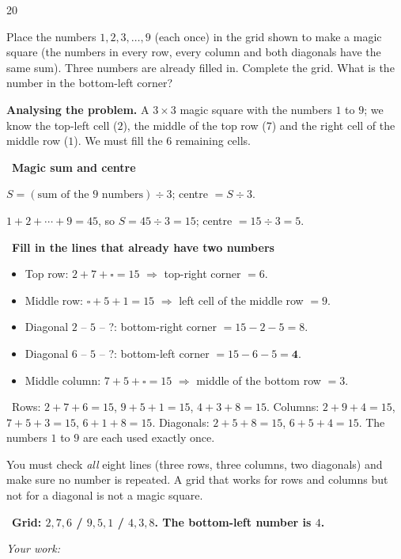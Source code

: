 \documentclass[11pt]{article}
\newif\ifsol \solfalse
\providecommand{\AnsWord}{Đáp số}
\newenvironment{probbox}[2]{\begin{probboxT}{#1}{#2}}{\end{probboxT}}
\newcommand{\StuProb}[2]{\begin{probboxS}{#1}{#2}\StuProbBody\end{probboxS}}
\newcommand{\ans}[1]{\par\smallskip{\bfseries\color{tmGreen!88!black}\AnsWord:}\ {\bfseries\color{AnsRed}#1}\par}
\newcommand{\probsol}[1]{%
  \begin{lrbox}{\solmeasure}\begin{minipage}{\dimexpr\linewidth-24pt\relax}#1\end{minipage}\end{lrbox}%
  \ifsol
    \begin{solbox}#1\end{solbox}%
  \else
    \setlength{\solht}{\dimexpr\ht\solmeasure+\dp\solmeasure+0.85cm\relax}%
    \ifdim\solht<1.35cm\setlength{\solht}{1.35cm}\fi
    \ifdim\solht>\StudentMaxWork\setlength{\solht}{\StudentMaxWork}\fi
    \par\noindent\begin{minipage}{\linewidth}%
    \expandafter\StuProb\StuProbArgs
    \begin{tcolorbox}[colback=white,colframe=Line,boxrule=0.8pt,arc=5pt,
      left=8pt,right=8pt,top=4pt,bottom=4pt,height=\solht]{\footnotesize\color{Slate}\itshape\WorkWord}\end{tcolorbox}%
    \end{minipage}\par\medskip
  \fi}
\newlength{\StudentMaxWork}\setlength{\StudentMaxWork}{4.5cm}
\newcommand{\step}[2]{\par\smallskip\noindent{\bfseries\color{tmBlue!85!black}\StepWord~#1.}\ {\bfseries #2}\par\nopagebreak}
\newcommand{\verify}[1]{\par\smallskip\noindent{\bfseries\color{tmGreen!80!black}\faCheckCircle\ \CheckWord}\ #1\par}
\def\WorkWord{Your work:}
\def\AnsWord{Answer}
\def\StepWord{Step}
\def\CheckWord{Check:}
\begin{document}
\begin{probbox}{20}{\relax}
\begin{minipage}[t]{0.63\linewidth}
Place the numbers $1, 2, 3, \ldots, 9$ (each once) in the grid shown to make a magic square (the numbers in every row, every column and both
diagonals have the same sum). Three numbers are already filled in. Complete the grid. What is the number in the bottom-left corner?
\end{minipage}\hfill
\begin{minipage}[t]{0.33\linewidth}\vspace{-4pt}\centering
{}
\end{minipage}
\end{probbox}
\probsol{
\textbf{Analysing the problem.} A $3\times 3$ magic square with the numbers $1$ to $9$; we know the top-left cell ($2$), the middle of the
top row ($7$) and the right cell of the middle row ($1$). We must fill the $6$ remaining cells.
\step{1}{Magic sum and centre}
\begin{recallbox}$S = (\text{sum of the } 9 \text{ numbers}) \div 3$; centre $= S \div 3$.\end{recallbox}
$1 + 2 + \cdots + 9 = 45$, so $S = 45 \div 3 = 15$; centre $= 15 \div 3 = 5$.
\step{2}{Fill in the lines that already have two numbers}
\begin{itemize}[leftmargin=1.4em,itemsep=1pt,topsep=1pt]
\item Top row: $2 + 7 + \square = 15$ $\Rightarrow$ top-right corner $= 6$.
\item Middle row: $\square + 5 + 1 = 15$ $\Rightarrow$ left cell of the middle row $= 9$.
\item Diagonal $2$ -- $5$ -- ?: bottom-right corner $= 15 - 2 - 5 = 8$.
\item Diagonal $6$ -- $5$ -- ?: bottom-left corner $= 15 - 6 - 5 = \mathbf{4}$.
\item Middle column: $7 + 5 + \square = 15$ $\Rightarrow$ middle of the bottom row $= 3$.
\end{itemize}
\begin{center}\lgaMagic{$2$}{$7$}{\textcolor{tmGreen!60!black}{$6$}}{\textcolor{tmGreen!60!black}{$9$}}{\textcolor{tmGreen!60!black}{$5$}}{$1$}{\textcolor{AnsRed}{$\mathbf{4}$}}{\textcolor{tmGreen!60!black}{$3$}}{\textcolor{tmGreen!60!black}{$8$}}\end{center}
\verify{Rows: $2 + 7 + 6 = 15$, $9 + 5 + 1 = 15$, $4 + 3 + 8 = 15$. Columns: $2 + 9 + 4 = 15$, $7 + 5 + 3 = 15$, $6 + 1 + 8 = 15$.
Diagonals: $2 + 5 + 8 = 15$, $6 + 5 + 4 = 15$. The numbers $1$ to $9$ are each used exactly once.}
\begin{warnbox}You must check \emph{all} eight lines (three rows, three columns, two diagonals) and make sure no number is repeated. A grid
that works for rows and columns but not for a diagonal is not a magic square.\end{warnbox}
\ans{Grid: $2, 7, 6$ / $9, 5, 1$ / $4, 3, 8$. The bottom-left number is $4$.}
}
\end{document}
